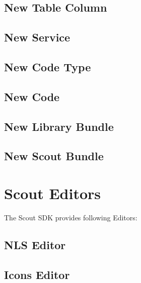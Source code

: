 \documentclass[a4paper,10pt,twoside]{book}
\begin{document}
\subsection{New Table Column}

\subsection{New Service}

\subsection{New Code Type}

\subsection{New Code}

\subsection{New Library Bundle}

\subsection{New Scout Bundle}




\section{Scout Editors}

The Scout SDK provides following Editors:
\subsection{NLS Editor}

\subsection{Icons Editor}

\end{document}
